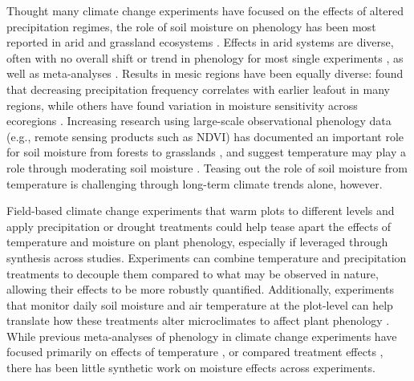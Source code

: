 \documentclass{article}
\begin{document}
Thought many climate change experiments have focused on the effects of altered precipitation regimes, the role of soil moisture on phenology has been most reported in arid and grassland ecosystems \citep[e.g., ][]{essiamah1986,reich1984, van1993, tao2019}. Effects in arid systems are diverse, often with no overall shift or trend in phenology for most single experiments \citep[e.g.,][]{sherry2007,de2017challenging,howell2020}, as well as meta-analyses \citep{lu2023contrasting}. Results in mesic regions have been equally diverse: \citet{wang2022} found that decreasing precipitation frequency correlates with earlier leafout in many regions, while others have found variation in moisture sensitivity across ecoregions \citep{seyed2018}. Increasing research using large-scale observational phenology data (e.g., remote sensing products such as NDVI) has documented an important role for soil moisture from forests to grasslands \citep{lian2020summer,shen2022plant,liu2024soil}, and suggest temperature may play a role through moderating soil moisture \citep{liu2024soil}. Teasing out the role of soil moisture from temperature is challenging through long-term climate trends alone, however. 

\par Field-based climate change experiments that warm plots to different levels and apply precipitation or drought treatments could help tease apart the effects of temperature and moisture on plant phenology, especially if leveraged through synthesis across studies. Experiments can combine temperature and precipitation treatments to decouple them compared to what may be observed in nature, allowing their effects to be more robustly quantified. Additionally, experiments that monitor daily soil moisture and air temperature at the plot-level can help translate how these treatments alter microclimates to affect plant phenology \citep{ettinger2019}. While previous meta-analyses of phenology in climate change experiments have focused primarily on effects of temperature \citep[e.g.,][]{wolkovich2012a}, or compared treatment effects \citep{zhou2023climate}, there has been little synthetic work on moisture effects across experiments. 
\end{document}
